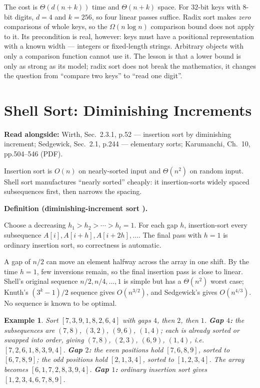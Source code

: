 \documentclass[11pt]{article}
\newtheorem{example}{Example}[section]
\newenvironment{definitionbox}[1]{%
  \par\noindent\textbf{Definition (#1).}\ \itshape
}{\par\vspace{0.3em}}
\begin{document}
The cost is $\Theta(d(n+k))$ time and $\Theta(n+k)$ space. For $32$-bit keys with $8$-bit digits, $d=4$ and $k=256$, so four linear passes suffice. Radix sort makes \emph{zero} comparisons of whole keys, so the $\Omega(n\log n)$ comparison bound does not apply to it. Its precondition is real, however: keys must have a positional representation with a known width --- integers or fixed-length strings. Arbitrary objects with only a comparison function cannot use it. The lesson is that a lower bound is only as strong as its model; radix sort does not break the mathematics, it changes the question from ``compare two keys'' to ``read one digit''.

\section{Shell Sort: Diminishing Increments}

\textbf{Read alongside:} Wirth, Sec.~2.3.1, p.52 --- insertion sort by diminishing increment; Sedgewick, Sec.~2.1, p.244 --- elementary sorts; Karumanchi, Ch.~10, pp.504--546 (PDF).

Insertion sort is $O(n)$ on nearly-sorted input and $\Theta(n^2)$ on random input. Shell sort manufactures ``nearly sorted'' cheaply: it insertion-sorts widely spaced subsequences first, then narrows the spacing.

\begin{definitionbox}{diminishing-increment sort \cite{Wirth2004_algorithms_data_structures,Sedgewick2011_algorithms}}
Choose a decreasing  $h_1>h_2>\cdots>h_t=1$. For each gap $h$, insertion-sort every subsequence $A[i],A[i+h],A[i+2h],\dots$. The final pass with $h=1$ is ordinary insertion sort, so correctness is automatic.
\end{definitionbox}

A gap of $n/2$ can move an element halfway across the array in one shift. By the time $h=1$, few inversions remain, so the final insertion pass is close to linear. Shell's original sequence $n/2,n/4,\dots,1$ is simple but has a $\Theta(n^2)$ worst case; Knuth's $(3^k-1)/2$ sequence gives $O(n^{3/2})$, and Sedgewick's gives $O(n^{4/3})$. No sequence is known to be optimal.

\begin{example}
Sort $[7,3,9,1,8,2,6,4]$ with gaps $4$, then $2$, then $1$.
\textbf{Gap $4$:} the subsequences are $(7,8)$, $(3,2)$, $(9,6)$, $(1,4)$; each is already sorted or swapped into order, giving $(7,8)$, $(2,3)$, $(6,9)$, $(1,4)$, i.e.\ $[7,2,6,1,8,3,9,4]$.
\textbf{Gap $2$:} the even positions hold $[7,6,8,9]$, sorted to $[6,7,8,9]$; the odd positions hold $[2,1,3,4]$, sorted to $[1,2,3,4]$. The array becomes $[6,1,7,2,8,3,9,4]$.
\textbf{Gap $1$:} ordinary insertion sort gives $[1,2,3,4,6,7,8,9]$.
\end{example}
\end{document}
